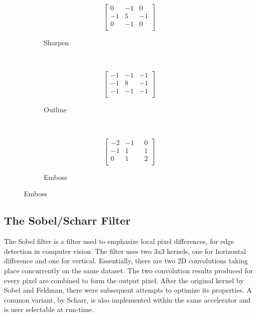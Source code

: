 \begin{figure}[H]
\centering
\begin{subfigure}[b]{.3\linewidth}
	\[
	\left[
	\begin{array}{rrr}
	0  & -1  &  0 \\
	-1 &  5  & -1 \\
	0  & -1  &  0 \\
	\end{array}
	\right]
	\]
	\caption{Sharpen}
\end{subfigure}
~
\begin{subfigure}[b]{.3\linewidth}
	\[
	\left[
	\begin{array}{rrr}
	-1  & -1  & -1 \\
	-1  &  8  & -1 \\
	-1  & -1  & -1 \\
	\end{array}
	\right]
	\]
	\caption{Outline}
\end{subfigure}
~
\begin{subfigure}[b]{.3\linewidth}
	\[
	\left[
	\begin{array}{rrr}
	-2  & -1  &  ~~~0 \\
	-1  &  1  &  ~~~1 \\
	 0  &  1  &  ~~~2 \\
	\end{array}
	\right]
	\]
	\caption{Emboss}
\end{subfigure}
\end{figure}

\subsection{The Sobel/Scharr Filter}

The Sobel filter is a filter used to emphasize local pixel differences,
for edge detection in computer vision. The filter uses two 3x3 kernels,
one for horizontal difference and one for vertical. Essentially,
there are two 2D convolutions taking place concurrently on the same dataset.
The two convolution results produced for every pixel are combined to
form the output pixel. After the original kernel by Sobel and Feldman,
there were subsequent attempts to optimize its properties. A common variant,
by Scharr, is also implemented within the same accelerator and is user selectable at run-time.

